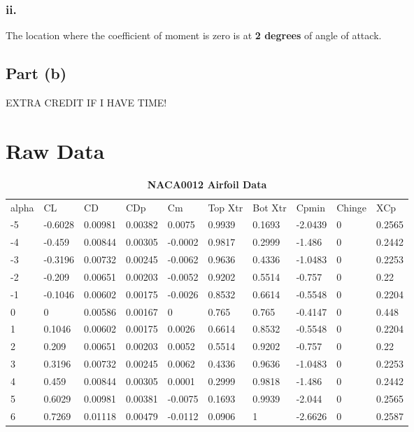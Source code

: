 \begin{singlespace}
\subsubsection{ii.}
The location where the coefficient of moment is zero is at \textbf{2 degrees} of angle of attack. 
\subsection{Part (b)}
    EXTRA CREDIT IF I HAVE TIME!

\newpage
\section{\textbf{Raw Data}}
\begin{table}[H]
\caption{\textbf{NACA0012 Airfoil Data}} \label{table:NACA0012_raw}
\begin{tabular}{|l|l|l|l|l|l|l|l|l|l|}
alpha & CL      & CD      & CDp     & Cm      & Top Xtr & Bot Xtr & Cpmin   & Chinge & XCp    \\
-5    & -0.6028 & 0.00981 & 0.00382 & 0.0075  & 0.9939  & 0.1693  & -2.0439 & 0      & 0.2565 \\
-4    & -0.459  & 0.00844 & 0.00305 & -0.0002 & 0.9817  & 0.2999  & -1.486  & 0      & 0.2442 \\
-3    & -0.3196 & 0.00732 & 0.00245 & -0.0062 & 0.9636  & 0.4336  & -1.0483 & 0      & 0.2253 \\
-2    & -0.209  & 0.00651 & 0.00203 & -0.0052 & 0.9202  & 0.5514  & -0.757  & 0      & 0.22   \\
-1    & -0.1046 & 0.00602 & 0.00175 & -0.0026 & 0.8532  & 0.6614  & -0.5548 & 0      & 0.2204 \\
0     & 0       & 0.00586 & 0.00167 & 0       & 0.765   & 0.765   & -0.4147 & 0      & 0.448  \\
1     & 0.1046  & 0.00602 & 0.00175 & 0.0026  & 0.6614  & 0.8532  & -0.5548 & 0      & 0.2204 \\
2     & 0.209   & 0.00651 & 0.00203 & 0.0052  & 0.5514  & 0.9202  & -0.757  & 0      & 0.22   \\
3     & 0.3196  & 0.00732 & 0.00245 & 0.0062  & 0.4336  & 0.9636  & -1.0483 & 0      & 0.2253 \\
4     & 0.459   & 0.00844 & 0.00305 & 0.0001  & 0.2999  & 0.9818  & -1.486  & 0      & 0.2442 \\
5     & 0.6029  & 0.00981 & 0.00381 & -0.0075 & 0.1693  & 0.9939  & -2.044  & 0      & 0.2565 \\
6     & 0.7269  & 0.01118 & 0.00479 & -0.0112 & 0.0906  & 1       & -2.6626 & 0      & 0.2587 \\

\end{tabular}
\end{table}
\end{singlespace}

